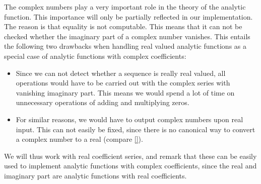 \documentclass{article}
\begin{document}
The complex numbers play a very important role in the theory of the analytic function. This importance will only be partially reflected in our implementation. The reason is that equality is not computable. This means that it can not be checked whether the imaginary part of a complex number vanishes. This entails the following two drawbacks when handling real valued analytic functions as a special case of analytic functions with complex coefficients:
\begin{itemize}
\item Since we can not detect whether a sequence is really real valued, all operations would have to be carried out with the complex series with vanishing imaginary part. This means we would spend a lot of time on unnecessary operations of adding and multiplying zeros.
\item For similar reasons, we would have to output complex numbers upon real input. This can not easily be fixed, since there is no canonical way to convert a complex number to a real (compare \cref{}).
\end{itemize}
We will thus work with real coefficient series, and remark that these can be easily used to implement analytic functions with complex coefficients, since the real and imaginary part are analytic functions with real coefficients.
\end{document}
